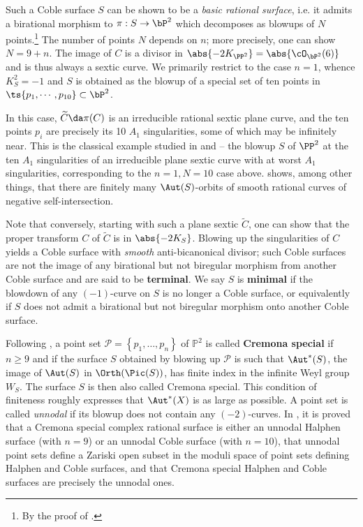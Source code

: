 \documentclass[../main.tex]{subfiles}
\begin{document}
\begin{remark}
Such a Coble surface $S$ can be shown to be a \textit{basic rational surface}, i.e. it admits a birational morphism to $\pi: S\to \bP^2$ which decomposes as blowups of $N$ points.\footnote{By the proof of \cite[Prop 9.13]{DK24}.} The number of points $N$ depends on $n$; more precisely, one can show $N = 9+n$. The image of $C$ is a divisor in $\abs{-2K_{\PP^2}} = \abs{\cO_{\bP^2}(6)}$ and is thus always a sextic curve. We primarily restrict to the case $n=1$, whence $K_S^2=-1$ and $S$ is obtained as the blowup of a special set of ten points in $\ts{p_1,\cdots, p_{10}} \subset \bP^2$. 

In this case, $\tilde C \da \pi(C)$ is an irreducible rational sextic plane curve, and the ten points $p_i$ are precisely its 10 $A_1$ singularities, some of which may be infinitely near. This is the classical example studied in \cite{Cob19} and \cite{Cob29} -- the blowup $S$ of $\PP^2$ at the ten $A_1$ singularities of an irreducible plane sextic curve with at worst $A_1$ singularities,  corresponding to the $n=1, N=10$ case above. \cite{Cob19} shows, among other things, that there are finitely many $\Aut(S)$-orbits of smooth rational curves of negative self-intersection.

Note that conversely, starting with such a plane sextic $\tilde C$, one can show that the proper transform $C$ of $\tilde C$ is in $\abs{-2K_S}$. Blowing up the singularities of $C$ yields a Coble surface with \textit{smooth} anti-bicanonical divisor; such Coble surfaces are not the image of any birational but not biregular morphism from another Coble surface and are said to be \textbf{terminal}. We say $S$ is \textbf{minimal} if the blowdown of any $(-1)$-curve on $S$ is no longer a Coble surface, or equivalently if $S$ does not admit a birational but not biregular morphism onto another Coble surface.
\end{remark}

\begin{remark}
Following \cite[\S 1.4]{CD12}, a point set $\mathcal{P}=\left\{p_{1}, \ldots, p_{n}\right\}$ of $\mathbb{P}^{2}$ is called \textbf{Cremona special} if $n \geq 9$ and if the surface $S$ obtained by blowing up $\mathcal{P}$ is such that $\Aut^*(S)$, the image of $\Aut(S)$ in $\Orth(\Pic(S))$, has finite index in the infinite Weyl group $W_{S}$. The surface $S$ is then also called Cremona special. This condition of finiteness roughly expresses that $\Aut^*(X)$ is as large as possible. A point set is called \textit{unnodal} if its blowup does not contain any $(-2)$-curves. In \cite{CD12}, it is proved that a Cremona special complex rational surface is either an unnodal Halphen surface (with $n=9$) or an unnodal Coble surface (with $n=10$), that unnodal point sets define a Zariski open subset in the moduli space of point sets defining Halphen and Coble surfaces, and that Cremona special Halphen and Coble surfaces are precisely the unnodal ones.
\end{remark}
\end{document}
